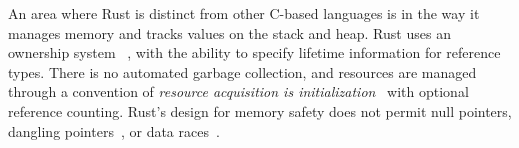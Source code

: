 An area where Rust is distinct from other C-based languages is in the way it manages memory and tracks values on the stack and heap. Rust uses an ownership system~\cite[Chapter~4]{programming.rust.2021} , with the ability to specify lifetime information for reference types. There is no automated garbage collection, and resources are managed through a convention of \textit{resource acquisition is initialization}~\cite{cpp.design.evolution.1994} with optional reference counting. Rust's design for memory safety does not permit null pointers, dangling pointers~\cite{taste.of.rust.2013}, or data races~\cite[Chapter~8.1]{rustonomicon}.
